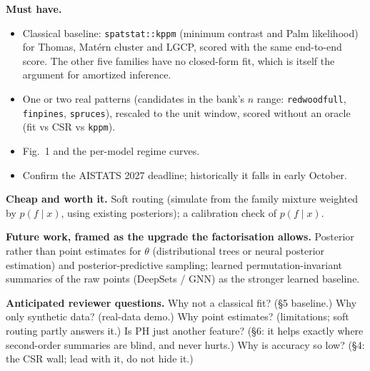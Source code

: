 \documentclass[11pt]{article}
\begin{document}
\textbf{Must have.}
\begin{itemize}
  \item Classical baseline: \texttt{spatstat::kppm} (minimum contrast and Palm likelihood) for Thomas, Mat\'ern cluster and
    LGCP, scored with the same end-to-end score. The other five families have no closed-form fit, which is itself the
    argument for amortized inference.
  \item One or two real patterns (candidates in the bank's $n$ range: \texttt{redwoodfull}, \texttt{finpines},
    \texttt{spruces}), rescaled to the unit window, scored without an oracle (fit vs CSR vs \texttt{kppm}).
  \item Fig.~1 and the per-model regime curves.
  \item Confirm the AISTATS 2027 deadline; historically it falls in early October.
\end{itemize}

\textbf{Cheap and worth it.} Soft routing (simulate from the family mixture weighted by $p(f\mid x)$, using existing
posteriors); a calibration check of $p(f\mid x)$.

\textbf{Future work, framed as the upgrade the factorisation allows.} Posterior rather than point estimates for $\theta$
(distributional trees or neural posterior estimation) and posterior-predictive sampling; learned permutation-invariant
summaries of the raw points (DeepSets / GNN) as the stronger learned baseline.

\textbf{Anticipated reviewer questions.} Why not a classical fit? (\S5 baseline.) Why only synthetic data? (real-data demo.)
Why point estimates? (limitations; soft routing partly answers it.) Is PH just another feature? (\S6: it helps exactly where
second-order summaries are blind, and never hurts.) Why is accuracy so low? (\S4: the CSR wall; lead with it, do not hide it.)
\end{document}
